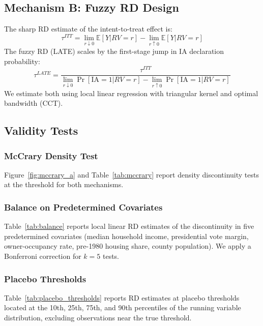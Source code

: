 \documentclass[12pt]{article}
\newcommand{\IA}{\textrm{IA}}
\newcommand{\RD}{\textrm{RD}}
\begin{document}
\subsection{Mechanism B: Fuzzy RD Design}

The sharp RD estimate of the intent-to-treat effect is:
\begin{equation}
  \tau^{ITT} = \lim_{r \downarrow 0} \mathbb{E}[Y | RV=r] -
               \lim_{r \uparrow 0} \mathbb{E}[Y | RV=r]
\end{equation}
The fuzzy RD (LATE) scales by the first-stage jump in \IA{} declaration
probability:
\begin{equation}
  \tau^{LATE} = \frac{\tau^{ITT}}{\lim_{r \downarrow 0} \Pr[\IA=1|RV=r] -
                                   \lim_{r \uparrow 0} \Pr[\IA=1|RV=r]}
\end{equation}
We estimate both using local linear regression with triangular kernel and
\citet{calonico2014} optimal bandwidth (CCT).

\subsection{Validity Tests}

\subsubsection{McCrary Density Test}
Figure~\ref{fig:mccrary_a} and Table~\ref{tab:mccrary} report \citet{cattaneo2020}
density discontinuity tests at the threshold for both mechanisms.

\subsubsection{Balance on Predetermined Covariates}
Table~\ref{tab:balance} reports local linear \RD{} estimates of the discontinuity
in five predetermined covariates (median household income, presidential vote margin,
owner-occupancy rate, pre-1980 housing share, county population).
We apply a Bonferroni correction for $k=5$ tests.

\subsubsection{Placebo Thresholds}
Table~\ref{tab:placebo_thresholds} reports \RD{} estimates at placebo thresholds
located at the 10th, 25th, 75th, and 90th percentiles of the running variable
distribution, excluding observations near the true threshold.
\end{document}
